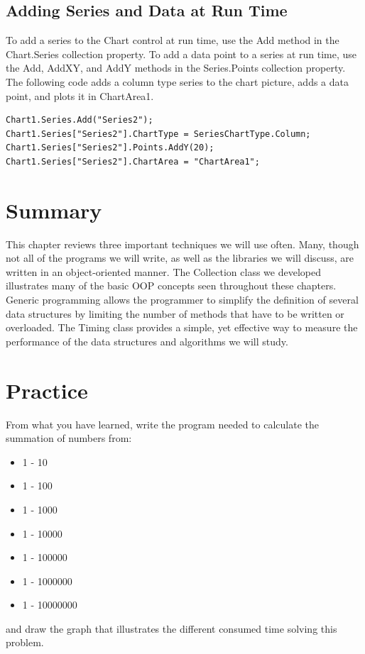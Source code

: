 \documentclass[12pt,a4paper,final,twoside,titlepage]{book}
\begin{document}
\subsection{Adding Series and Data at Run Time}
To add a series to the Chart control at run time, use the Add method in the Chart.Series collection property. To add a data point to a series at run time, use the Add, AddXY, and AddY methods in the Series.Points collection property.
The following code adds a column type series to the chart picture, adds a data point, and plots it in ChartArea1.
\begin{lstlisting}
Chart1.Series.Add("Series2");
Chart1.Series["Series2"].ChartType = SeriesChartType.Column;
Chart1.Series["Series2"].Points.AddY(20);
Chart1.Series["Series2"].ChartArea = "ChartArea1";
\end{lstlisting}
\section{Summary}
This chapter reviews three important techniques we will use often. Many, though not all of the programs we will write, as well as the libraries we will discuss, are written in an object-oriented manner. The Collection class we developed illustrates many of the basic OOP concepts seen throughout these chapters. Generic programming allows the programmer to simplify the definition of several data structures by limiting the number of methods that have to be written or overloaded. The Timing class provides a simple, yet effective way to measure the performance of the data structures and algorithms we will study.
\section{Practice}
From what you have learned, write the program needed to calculate the summation of numbers from:
\begin{itemize}
\item 1 - 10
\item 1 - 100
\item 1 - 1000
\item 1 - 10000
\item 1 - 100000
\item 1 - 1000000
\item 1 - 10000000
\end{itemize}
and draw the graph that illustrates the different consumed time solving this problem.
\end{document}
